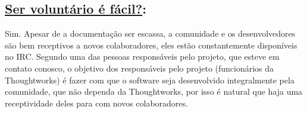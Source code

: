 \subsection*{\underline{Ser voluntário é fácil?}:}

Sim. Apesar de a documentação ser escassa, a comunidade e os desenvolvedores são bem receptivos a novos colaboradores, eles estão constantemente disponíveis no IRC.
Segundo uma das pessoas responsáveis pelo projeto, que esteve em contato conosco, o objetivo dos responsáveis pelo projeto (funcionários da Thoughtworks) é fazer com que o software seja desenvolvido integralmente pela comunidade, que não dependa da Thoughtworks, por isso é natural que haja uma receptividade deles para com novos colaboradores.
